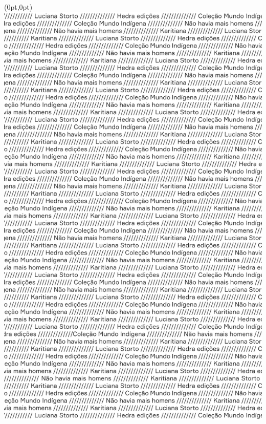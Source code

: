 \thispagestyle{empty}
\begin{textblock*}{2.625in}(0pt,0pt)%
\vspace*{-2.4cm}
\hspace*{-2.65cm}\includegraphics[width=138mm]{./MI_STORTO_HOMENS_ABERTURA.png}  
\end{textblock*}
\clearpage
\pagebreak


